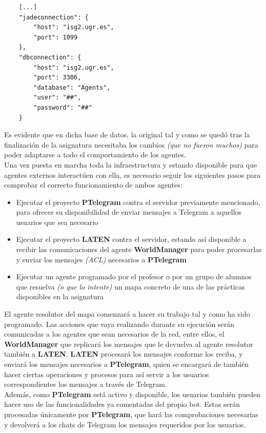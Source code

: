 \begin{lstlisting}
    [...]
    "jadeconnection": {
        "host": "isg2.ugr.es",
        "port": 1099
    },
    "dbconnection": {
        "host": "isg2.ugr.es",
        "port": 3306,
        "database": "Agents",
        "user": "##",
        "password": "##"
    }
\end{lstlisting}

Es evidente que en dicha base de datos, la original tal y como se quedó tras la finalización de la asignatura necesitaba los cambios \textit{(que no fueron muchos)} para poder adaptarse a todo el comportamiento de los agentes.\\

Una vez puesta en marcha toda la infraestructura y estando disponible para que agentes externos interactúen con ella, es necesario seguir los siguientes pasos para comprobar el correcto funcionamiento de ambos agentes:\\

\begin{itemize}
	\item Ejecutar el proyecto \textbf{PTelegram} contra el servidor previamente mencionado, para ofrecer su disponibilidad de enviar mensajes a Telegram a aquellos usuarios que sea necesario
	\item Ejecutar el proyecto \textbf{LATEN} contra el servidor, estando así disponible a recibir las comunicaciones del agente \textbf{WorldManager} para poder procesarlas y enviar los mensajes \textit{(ACL)} necesarios a \textbf{PTelegram} 
	\item Ejecutar un agente programado por el profesor o por un grupo de alumnos que resuelva \textit{(o que lo intente)} un mapa concreto de una de las prácticas disponibles en la asignatura
\end{itemize}

El agente resolutor del mapa comenzará a hacer su trabajo tal y como ha sido programado. Las acciones que vaya realizando durante su ejecución serán comunicadas a los agentes que sean necesarios de la red, entre ellos, el \textbf{WorldManager} que replicará los mensajes que le devuelva al agente resolutor también a \textbf{LATEN}. \textbf{LATEN} procesará los mensajes conforme los reciba, y enviará los mensajes necesarios a \textbf{PTelegram}, quien se encargará de también hacer ciertas operaciones y procesos para así servir a los usuarios correspondientes los mensajes a través de Telegram.\\

Además, como \textbf{PTelegram} está activo y disponible, los usuarios también pueden hacer uso de las funcionalidades ya comentadas del propio bot. Estas serán procesadas únicamente por \textbf{PTelegram}, que hará las comprobaciones necesarias y devolverá a los chats de Telegram los mensajes requeridos por los usuarios.
